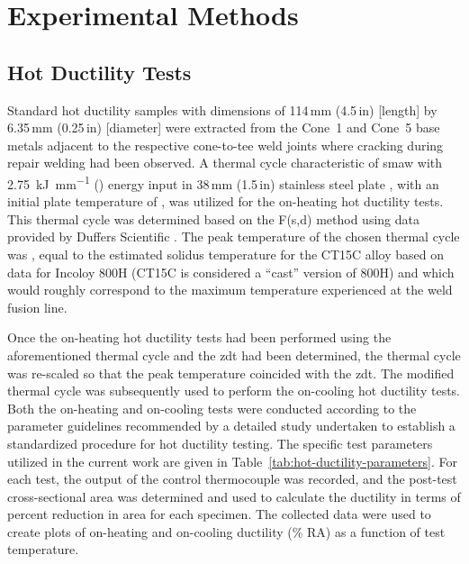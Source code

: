 \chapter{Experimental Methods} \label{ch:experimental-methods}

\section{Hot Ductility Tests}
Standard hot ductility samples with dimensions of 114\,mm (4.5\,in) [length] by 6.35\,mm (0.25\,in) [diameter] were extracted from the Cone~1 and Cone~5 base metals adjacent to the respective cone-to-tee weld joints where cracking during repair welding had been observed.  A thermal cycle characteristic of \gls{smaw} with \SI[round-mode=places,round-precision=2]{2.75}{\kilo\joule\per\milli\meter} () energy input in 38\,mm (1.5\,in) stainless steel plate \cite{nippes_heat-affected_1955}, with an initial plate temperature of , was utilized for the on-heating hot ductility tests.  This thermal cycle was determined based on the F(s,d) method \cite{nippes_cooling_1949} using data provided by Duffers Scientific \cite{duffers_haz_1989}. The peak temperature of the chosen thermal cycle was , equal to the estimated solidus temperature for the CT15C alloy based on data for Incoloy 800H (CT15C is considered a ``cast'' version of 800H) and which would roughly correspond to the maximum temperature experienced at the weld fusion line.

Once the on-heating hot ductility tests had been performed using the aforementioned thermal cycle and the \gls{zdt} had been determined, the thermal cycle was re-scaled so that the peak temperature coincided with the \gls{zdt}. The modified thermal cycle was subsequently used to perform the on-cooling hot ductility tests.  Both the on-heating and on-cooling tests were conducted according to the parameter guidelines recommended by a detailed study \cite{lundin_standardization_1990_experiment} undertaken to establish a standardized procedure for hot ductility testing.  The specific test parameters utilized in the current work are given in Table~\ref{tab:hot-ductility-parameters}.  For each test, the output of the control thermocouple was recorded, and the post-test cross-sectional area was determined and used to calculate the ductility in terms of percent reduction in area for each specimen.  The collected data were used to create plots of on-heating and on-cooling ductility (\% RA) as a function of test temperature.

